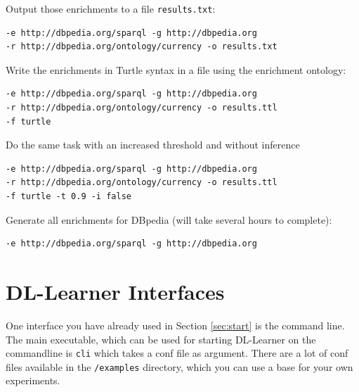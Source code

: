 \documentclass[a4paper,12pt]{scrartcl}
\newcommand{\todo}[1]{\textbf{[ToDo: #1]}}
\begin{document}
Output those enrichments to a file \verb|results.txt|:
\begin{verbatim}
-e http://dbpedia.org/sparql -g http://dbpedia.org 
-r http://dbpedia.org/ontology/currency -o results.txt
\end{verbatim}

Write the enrichments in Turtle syntax in a file using the enrichment ontology:
\begin{verbatim}
-e http://dbpedia.org/sparql -g http://dbpedia.org 
-r http://dbpedia.org/ontology/currency -o results.ttl
-f turtle
\end{verbatim}

Do the same task with an increased threshold and without inference

\begin{verbatim}
-e http://dbpedia.org/sparql -g http://dbpedia.org 
-r http://dbpedia.org/ontology/currency -o results.ttl
-f turtle -t 0.9 -i false
\end{verbatim}

Generate all enrichments for DBpedia (will take several hours to complete):
\begin{verbatim}
-e http://dbpedia.org/sparql -g http://dbpedia.org 
\end{verbatim}


\section{DL-Learner Interfaces}



One interface you have already used in Section \ref{sec:start} is the command line. The main executable, which can be used for starting DL-Learner on the commandline is \verb|cli| which takes a conf file as argument. There are a lot of conf files available in the \verb|/examples| directory, which you can use a base for your own experiments.

\end{document}
